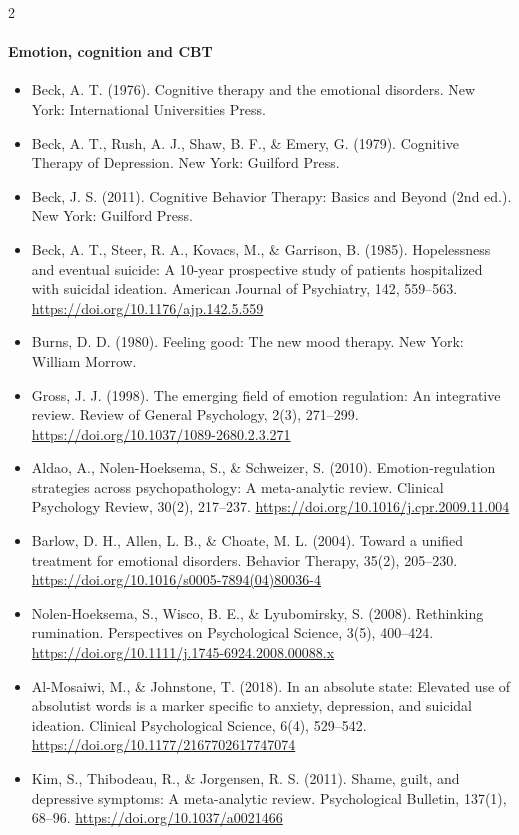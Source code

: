 \documentclass[10pt]{article}
\theoremstyle{definition}
\theoremstyle{remark}
\begin{document}
\begin{multicols}{2}
\footnotesize
\paragraph{Emotion, cognition and CBT}
\begin{itemize}[leftmargin=1em,itemsep=0pt,topsep=1pt,parsep=0pt]
\item Beck, A. T. (1976). Cognitive therapy and the emotional disorders. New York: International Universities Press.
\item Beck, A. T., Rush, A. J., Shaw, B. F., \& Emery, G. (1979). Cognitive Therapy of Depression. New York: Guilford Press.
\item Beck, J. S. (2011). Cognitive Behavior Therapy: Basics and Beyond (2nd ed.). New York: Guilford Press.
\item Beck, A. T., Steer, R. A., Kovacs, M., \& Garrison, B. (1985). Hopelessness and eventual suicide: A 10-year prospective study of patients hospitalized with suicidal ideation. American Journal of Psychiatry, 142, 559--563. \url{https://doi.org/10.1176/ajp.142.5.559}
\item Burns, D. D. (1980). Feeling good: The new mood therapy. New York: William Morrow.
\item Gross, J. J. (1998). The emerging field of emotion regulation: An integrative review. Review of General Psychology, 2(3), 271--299. \url{https://doi.org/10.1037/1089-2680.2.3.271}
\item Aldao, A., Nolen-Hoeksema, S., \& Schweizer, S. (2010). Emotion-regulation strategies across psychopathology: A meta-analytic review. Clinical Psychology Review, 30(2), 217--237. \url{https://doi.org/10.1016/j.cpr.2009.11.004}
\item Barlow, D. H., Allen, L. B., \& Choate, M. L. (2004). Toward a unified treatment for emotional disorders. Behavior Therapy, 35(2), 205--230. \url{https://doi.org/10.1016/s0005-7894(04)80036-4}
\item Nolen-Hoeksema, S., Wisco, B. E., \& Lyubomirsky, S. (2008). Rethinking rumination. Perspectives on Psychological Science, 3(5), 400--424. \url{https://doi.org/10.1111/j.1745-6924.2008.00088.x}
\item Al-Mosaiwi, M., \& Johnstone, T. (2018). In an absolute state: Elevated use of absolutist words is a marker specific to anxiety, depression, and suicidal ideation. Clinical Psychological Science, 6(4), 529--542. \url{https://doi.org/10.1177/2167702617747074}
\item Kim, S., Thibodeau, R., \& Jorgensen, R. S. (2011). Shame, guilt, and depressive symptoms: A meta-analytic review. Psychological Bulletin, 137(1), 68--96. \url{https://doi.org/10.1037/a0021466}

\end{itemize}
\end{multicols}
\end{document}
